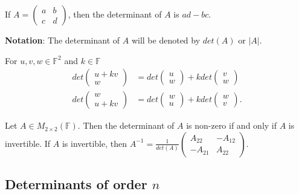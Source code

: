 \documentclass[12pt]{article}
\newenvironment{theorem}[2][Theorem]{\begin{trivlist}
\item[\hskip \labelsep {\bfseries #1}\hskip \labelsep {\bfseries #2.}]}{\end{trivlist}}
\newenvironment{definition}[2][Definition]{\begin{trivlist}
\item[\hskip \labelsep {\bfseries #1}\hskip \labelsep {\bfseries #2}]}{\end{trivlist}}
\begin{document}
\begin{definition}{1}
If $A = \begin{pmatrix}
a & b \\
c & d
\end{pmatrix}$, then the determinant of $A$ is $ad-bc$.
\end{definition}

\textbf{Notation}: The determinant of $A$ will be denoted by $det(A)$ or $\lvert A \rvert$.

\begin{theorem}{4.1}
For $u, v, w \in \mathbb{F}^2$ and $k \in \mathbb{F}$
\begin{align*}
    det \begin{pmatrix}
    u + kv \\ w
    \end{pmatrix} &= det \begin{pmatrix}
    u \\ w
    \end{pmatrix} + kdet \begin{pmatrix}
    v \\ w
    \end{pmatrix} \\ 
    det \begin{pmatrix}
    w \\ u + kv
    \end{pmatrix} &= det \begin{pmatrix}
    w \\ u
    \end{pmatrix} + kdet \begin{pmatrix}
    w \\ v
    \end{pmatrix}.
\end{align*}
\end{theorem}

\begin{theorem}{4.2}
Let $A \in M_{2 \times 2}(\mathbb{F})$. Then the determinant of $A$ is non-zero if and only if $A$ is invertible. If $A$ is invertible, then $A^{-1} = \frac{1}{det(A)}\begin{pmatrix}
A_{22} & -A_{12} \\ -A_{21} & A_{22}
\end{pmatrix}$.
\end{theorem}

\subsection{Determinants of order $n$}
\end{document}
